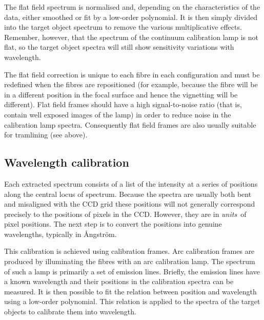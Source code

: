 \documentclass[twoside,11pt]{article}
\begin{document}
The flat field spectrum is normalised and, depending on the characteristics
of the data, either smoothed or fit by a low-order polynomial.  It is then
simply divided into the target object spectrum to remove the various
multiplicative effects.  Remember, however, that the spectrum of the
continuum calibration lamp is not flat, so the target object spectra will
still show sensitivity variations with wavelength.

The flat field correction is unique to each fibre in each configuration
and must be redefined when the fibres are repositioned (for example,
because the fibre will be in a different position in the focal surface
and hence the vignetting will be different).  Flat field frames should
have a high signal-to-noise ratio (that is, contain well exposed images
of the lamp) in order to reduce noise in the calibration lamp spectra.
Consequently flat field frames are also usually suitable for tramlining
(see above).

\subsection{\label{WAVEC}Wavelength calibration}

Each extracted spectrum consists of a list of the intensity at a series
of positions along the central locus of spectrum.  Because the spectra
are usually both bent and misaligned with the CCD grid these positions
will not generally correspond precisely to the positions of pixels in
the CCD.  However, they are in {\it units}\, of pixel positions.  The
next step is to convert the positions into genuine wavelengths,
typically in \AA ngstr\"{o}m.

This calibration is achieved using calibration frames.  Arc calibration
frames are produced by illuminating the fibres with an arc calibration
lamp.  The spectrum of such a lamp is primarily a set of emission lines.
Briefly, the emission lines have a known wavelength and their positions
in the calibration spectra can be measured.  It is then possible to fit
the relation between position and wavelength using a low-order
polynomial.  This relation is applied to the spectra of the target
objects to calibrate them into wavelength.
\end{document}
